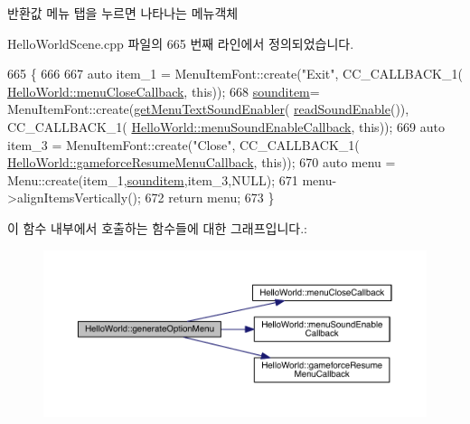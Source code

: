 \begin{DoxyReturn}{반환값}
메뉴 탭을 누르면 나타나는 메뉴객체 
\end{DoxyReturn}


Hello\+World\+Scene.\+cpp 파일의 665 번째 라인에서 정의되었습니다.


\begin{DoxyCode}
665                                     \{
666     
667     \textcolor{keyword}{auto} item\_1 = MenuItemFont::create(\textcolor{stringliteral}{"Exit"}, CC\_CALLBACK\_1(
      \hyperlink{class_hello_world_ac4ab2f5e922e659d4f137591c0f6a9b0}{HelloWorld::menuCloseCallback}, \textcolor{keyword}{this}));
668      \hyperlink{class_hello_world_adb09915c0ac4077d51f46e2645bc4c0a}{sounditem}= MenuItemFont::create(\hyperlink{class_hello_world_a85e65e13718aba32a3a35044f0f694c5}{getMenuTextSoundEnabler}(
      \hyperlink{class_hello_world_a0f8c9d1b95e03b397e680b9dafb8f3d9}{readSoundEnable}()), CC\_CALLBACK\_1(
      \hyperlink{class_hello_world_aa0aab5c2537449752853c2924db53261}{HelloWorld::menuSoundEnableCallback}, \textcolor{keyword}{this}));
669     \textcolor{keyword}{auto} item\_3 = MenuItemFont::create(\textcolor{stringliteral}{"Close"}, CC\_CALLBACK\_1(
      \hyperlink{class_hello_world_a9765d6e42b96bcf6c025ae1905bd7a90}{HelloWorld::gameforceResumeMenuCallback}, \textcolor{keyword}{this}));
670     \textcolor{keyword}{auto} menu = Menu::create(item\_1,\hyperlink{class_hello_world_adb09915c0ac4077d51f46e2645bc4c0a}{sounditem},item\_3,NULL);
671     menu->alignItemsVertically();
672     \textcolor{keywordflow}{return} menu;
673 \}
\end{DoxyCode}
이 함수 내부에서 호출하는 함수들에 대한 그래프입니다.\+:
\nopagebreak
\begin{figure}[H]
\begin{center}
\leavevmode
\includegraphics[width=350pt]{d9/d98/class_hello_world_a24162678657656105f59887233f9c841_cgraph}
\end{center}
\end{figure}
\mbox{\label{class_hello_world_a85e65e13718aba32a3a35044f0f694c5}} 
